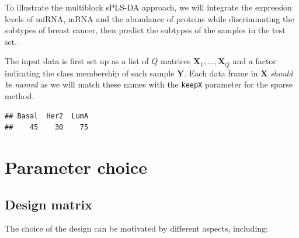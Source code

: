 \documentclass[]{book}
\newenvironment{Shaded}{\begin{snugshade}}{\end{snugshade}}
\newcommand{\KeywordTok}[1]{\textcolor[rgb]{0.13,0.29,0.53}{\textbf{#1}}}
\newcommand{\DataTypeTok}[1]{\textcolor[rgb]{0.13,0.29,0.53}{#1}}
\newcommand{\StringTok}[1]{\textcolor[rgb]{0.31,0.60,0.02}{#1}}
\newcommand{\CommentTok}[1]{\textcolor[rgb]{0.56,0.35,0.01}{\textit{#1}}}
\newcommand{\OperatorTok}[1]{\textcolor[rgb]{0.81,0.36,0.00}{\textbf{#1}}}
\newcommand{\NormalTok}[1]{#1}
\begin{document}
To illustrate the multiblock sPLS-DA approach, we will integrate the
expression levels of miRNA, mRNA and the abundance of proteins while
discriminating the subtypes of breast cancer, then predict the subtypes
of the samples in the test set.

The input data is first set up as a list of \(Q\) matrices
\(\boldsymbol X_1, \dots, \boldsymbol X_Q\) and a factor indicating the
class membership of each sample \(\boldsymbol Y\). Each data frame in
\(\boldsymbol X\) \emph{should be named} as we will match these names
with the \texttt{keepX} parameter for the sparse method.

\begin{Shaded}
\end{Shaded}

\begin{verbatim}
## Basal  Her2  LumA 
##    45    30    75
\end{verbatim}

\section{Parameter choice}\label{parameter-choice}

\subsection{Design matrix}\label{diablo:design}

The choice of the design can be motivated by different aspects,
including:
\end{document}
